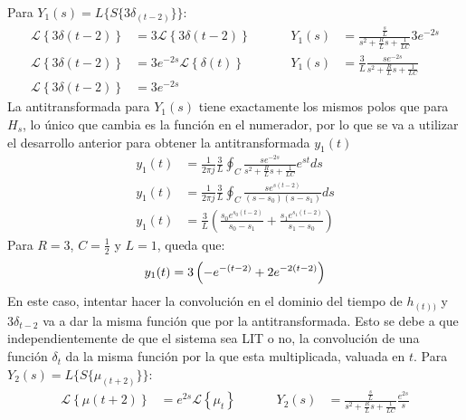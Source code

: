 \documentclass[12pt,a4paper]{report}
\begin{document}
\begin{enumerate}[label=\alph*)]
      Para $Y_1(s) = L\{S\{3\delta_{(t-2)}\}\}$:
      \begin{align*}
        \mathcal{L} \left\{3\delta (t-2)\right\} &= 3\mathcal{L}\left\{3\delta (t-2)\right\} \hspace{1cm} &Y_1(s) 
                                                 &= \frac{\frac{s}{L}}{s^2 + \frac{R}{L} s + \frac{1}{LC}} 3e^{-2s}\\[6pt]
        \mathcal{L} \left\{3\delta (t-2)\right\} &= 3 e^{-2s}\mathcal{L}\left\{\delta (t)\right\} &Y_1(s) 
                                                 &= \frac{3}{L}\frac{se^{-2s}}{s^2 + \frac{R}{L} s + \frac{1}{LC}}\\[6pt]
        \mathcal{L} \left\{3\delta (t-2)\right\} &= 3 e^{-2s}
      \end{align*}
      La antitransformada para $Y_1(s)$ tiene exactamente los mismos polos que para $H_s$, lo único que cambia es la
      función en el numerador, por lo que se va a utilizar el desarrollo anterior para obtener la antitransformada $y_1(t)$
      \begin{align*}
        y_1(t) &= \frac{1}{2\pi j} \frac{3}{L} \oint_C \frac{se^{-2s}}{s^2 + \frac{R}{L} s + \frac{1}{LC}} e^{st} ds\\[6pt]
        y_1(t) &= \frac{1}{2\pi j} \frac{3}{L} \oint_C \frac{se^{s(t-2)}}{(s-s_0)(s-s_1)} ds\\[6pt]
        y_1(t) &= \frac{3}{L} \left(\frac{s_0 e^{s_0(t-2)}}{s_0 - s_1} + \frac{s_1 e^{s_1(t-2)}}{s_1 - s_0}\right)
      \end{align*}
      Para $R = 3$, $C = \frac{1}{2}$ y $L = 1$, queda que:
      \begin{equation*}
        y_1(t) = 3\left(-e^{-(t-2)} + 2e^{-2(t-2)}\right)\\[6pt]
      \end{equation*}
      En este caso, intentar hacer la convolución en el dominio del tiempo de $h_{(t))}$ y $3\delta_{t-2}$ va a dar la
      misma función que por la antitransformada. Esto se debe a que independientemente de que el sistema sea LIT o no,
      la convolución de una función $\delta_t$ da la misma función por la que esta multiplicada, valuada en $t$.
      Para $Y_2(s) = L\{S\{\mu_{(t+2)}\}\}$:
      \begin{align*}
        \mathcal{L} \left\{\mu (t+2)\right\} &= e^{2s}\mathcal{L}\left\{\mu_t\right\} \hspace{1cm} &Y_2(s)
          &= \frac{\frac{s}{L}}{s^2 + \frac{R}{L} s + \frac{1}{LC}} \frac{e^{2s}}{s}\\[6pt]

\end{align*}
\end{enumerate}
\end{document}
